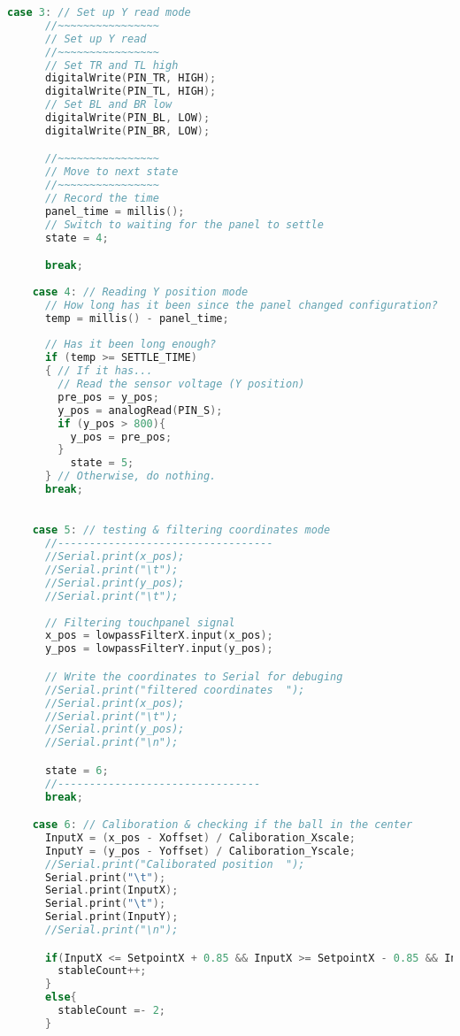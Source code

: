 \begin{lstlisting}[language=C++ , caption= Arduino  full code for controlling the system by internal PID]
    case 3: // Set up Y read mode
      //~~~~~~~~~~~~~~~~
      // Set up Y read
      //~~~~~~~~~~~~~~~~
      // Set TR and TL high
      digitalWrite(PIN_TR, HIGH);
      digitalWrite(PIN_TL, HIGH);
      // Set BL and BR low
      digitalWrite(PIN_BL, LOW);
      digitalWrite(PIN_BR, LOW);

      //~~~~~~~~~~~~~~~~
      // Move to next state
      //~~~~~~~~~~~~~~~~
      // Record the time
      panel_time = millis();
      // Switch to waiting for the panel to settle
      state = 4;

      break;
      
    case 4: // Reading Y position mode
      // How long has it been since the panel changed configuration?
      temp = millis() - panel_time;
      
      // Has it been long enough?
      if (temp >= SETTLE_TIME)
      { // If it has...
        // Read the sensor voltage (Y position)
        pre_pos = y_pos; 
        y_pos = analogRead(PIN_S);
        if (y_pos > 800){
          y_pos = pre_pos;
        }
          state = 5;
      } // Otherwise, do nothing.
      break;
    

    case 5: // testing & filtering coordinates mode
      //----------------------------------
      //Serial.print(x_pos);
      //Serial.print("\t");
      //Serial.print(y_pos);
      //Serial.print("\t");
      
      // Filtering touchpanel signal
      x_pos = lowpassFilterX.input(x_pos);
      y_pos = lowpassFilterY.input(y_pos);

      // Write the coordinates to Serial for debuging
      //Serial.print("filtered coordinates  ");
      //Serial.print(x_pos);
      //Serial.print("\t");
      //Serial.print(y_pos);
      //Serial.print("\n");

      state = 6;
      //--------------------------------
      break;

    case 6: // Caliboration & checking if the ball in the center
      InputX = (x_pos - Xoffset) / Caliboration_Xscale;
      InputY = (y_pos - Yoffset) / Caliboration_Yscale;
      //Serial.print("Caliborated position  ");
      Serial.print("\t");
      Serial.print(InputX);
      Serial.print("\t");
      Serial.print(InputY);
      //Serial.print("\n");

      if(InputX <= SetpointX + 0.85 && InputX >= SetpointX - 0.85 && InputY <= SetpointY + 1.25 && InputY >= SetpointY - 1.25 ){
        stableCount++;
      }
      else{
        stableCount =- 2;
      }
        

\end{lstlisting}
